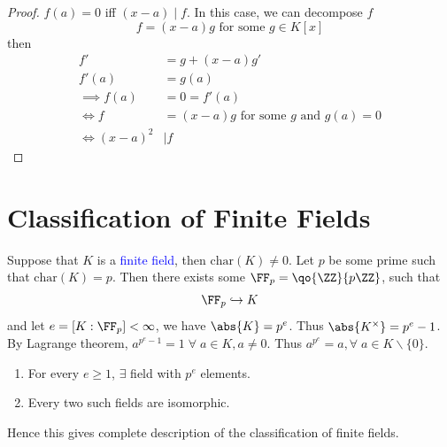 \begin{proof}
	\( f(a) = 0 \) iff \( (x-a) \mid f \). In this case, we can decompose \( f \)
	\[
		f = (x-a) g \text{ for some } g \in K[x]
	\]
	then
	\[
		\begin{aligned}
			f'            & = g + (x-a)g'                                      \\
			f'(a)         & = g(a)                                             \\
			\implies f(a) & = 0 = f'(a)                                        \\
			\iff f        & = (x-a)g \text{ for some } g \text{ and } g(a) = 0 \\
			\iff (x-a)^2  & \mid f
		\end{aligned}
	\]
\end{proof}

\section{Classification of Finite Fields}
Suppose that \( K \) is a \textcolor{blue}{finite field}, then \( \text{char}(K) \ne 0 \). Let \( p \) be some
prime such that \( \text{char}(K) = p \). Then there exists some \( \FF_p = \qo{\ZZ}{p\ZZ} \), such
that
\[
	\FF_p \hookrightarrow K
\]
and let \( e = [K: \FF_p] < \infty \), we have \( \abs{K} = p^e \). Thus \( \abs{K^\times} = p^e - 1 \). By Lagrange theorem,
\( a^{p^e - 1} = 1 \; \forall \; a\in K, a\ne 0 \). Thus \( a^{p^e} = a, \forall \; a\in K
\smallsetminus \{0\} \).

\begin{theorem}
	\leavevmode
	\begin{enumerate}
		\item For every \( e \geq 1 \), \( \exists \) field with \( p^e \) elements.
		\item Every two such fields are isomorphic.
	\end{enumerate}
	Hence this gives complete description of the classification of finite fields.
\end{theorem}


